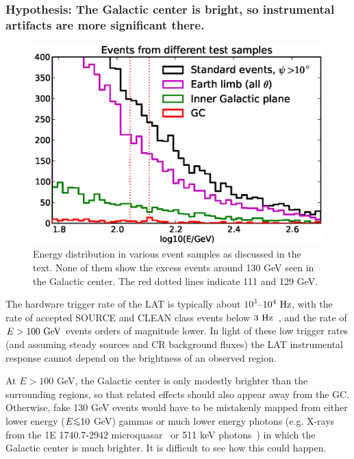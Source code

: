 \documentclass[aps,twocolumn,prd,superscriptaddress,showpacs,nofootinbib,fixfloat]{revtex4}
\newcommand{\Hz}{{\rm ~Hz}}
\newcommand{\GeV}{{\rm ~GeV}}
\def\la{\vcenter{\hbox{$<$}\offinterlineskip\hbox{$\sim$}}}
\begin{document}
\subsubsection{Hypothesis: The Galactic center is bright, so
instrumental artifacts are more significant there.}

\begin{figure}
  \centering
  \includegraphics[width=1.0\linewidth]{plots/target_spectra.eps}
  \caption{Energy distribution in various event samples 
      as
  discussed in the text. None of them show the excess events
  around 130 GeV seen in the Galactic center. The red dotted
  lines indicate 111 and 129 GeV.}
  \label{fig:target_spectra}
\end{figure}

The hardware trigger rate of the LAT is typically
about $10^3$--$10^4\Hz$, with the rate of
accepted SOURCE and CLEAN class events below
$3\Hz$~\citep{collaboration:2012kca}, and the rate of $E>100\GeV$ events
orders of magnitude lower. In light of these low trigger rates
(and assuming steady sources and CR background fluxes) the
LAT instrumental response cannot
depend on the brightness of an observed region.

At $E > 100$ GeV, the Galactic center is only modestly brighter
than the surrounding regions, so that related effects should also appear away
from the GC. Otherwise, fake 130 GeV events would have to be mistakenly
mapped from either lower energy ($E \la 10$ GeV) gammas or much lower energy
photons (e.g.  X-rays from the 1E 1740.7-2942 microquasar~\cite{Gallo:2002} or
511 keV photons~\cite{Prantzos:2011}) in which the Galactic center is much
brighter.  It is difficult to see how this could happen.
\end{document}
